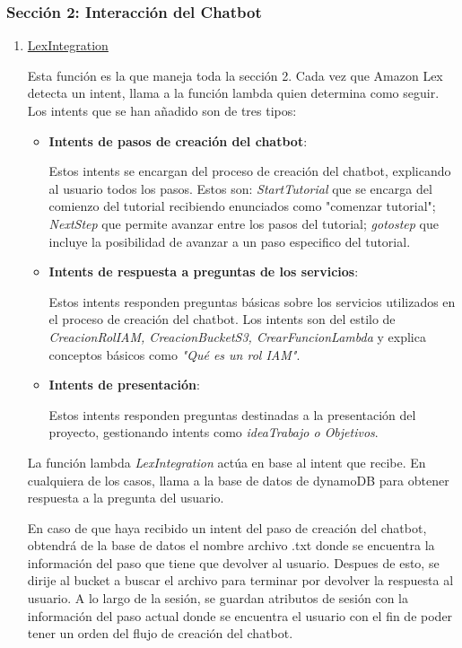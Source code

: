 \subsubsection{Sección 2: Interacción del Chatbot}\label{sec:lexintegration}
\begin{enumerate}[7.]
    \item \underline{LexIntegration} 
    
    Esta función es la que maneja toda la sección 2. Cada vez que Amazon Lex detecta un intent, llama a la función lambda quien determina como seguir. Los intents que se han añadido son de tres tipos:
    \begin{itemize}
    \tightlist
        \item \textbf{Intents de pasos de creación del chatbot}:

        Estos intents se encargan del proceso de creación del chatbot, explicando al usuario todos los pasos. Estos son: \textit{StartTutorial} que se encarga del comienzo del tutorial recibiendo enunciados como "comenzar tutorial"; \textit{NextStep} que permite avanzar entre los pasos del tutorial; \textit{gotostep} que incluye la posibilidad de avanzar a un paso especifico del tutorial.

        \item \textbf{Intents de respuesta a preguntas de los servicios}:

        Estos intents responden preguntas básicas sobre los servicios utilizados en el proceso de creación del chatbot. Los intents son del estilo de \textit{CreacionRolIAM, CreacionBucketS3, CrearFuncionLambda} y explica conceptos básicos como \textit{"Qué es un rol IAM"}.

        \item \textbf{Intents de presentación}:

        Estos intents responden preguntas destinadas a la presentación del proyecto, gestionando intents como \textit{ideaTrabajo o Objetivos}. 
    \end{itemize}

    La función lambda \textit{LexIntegration} actúa en base al intent que recibe. En cualquiera de los casos, llama a la base de datos de dynamoDB para obtener respuesta a la pregunta del usuario. 

    En caso de que haya recibido un intent del paso de creación del chatbot, obtendrá de la base de datos el nombre archivo .txt donde se encuentra la información del paso que tiene que devolver al usuario. Despues de esto, se dirije al bucket a buscar el archivo para terminar por devolver la respuesta al usuario. A lo largo de la sesión, se guardan atributos de sesión con la información del paso actual donde se encuentra el usuario con el fin de poder tener un orden del flujo de creación del chatbot. 
    

\end{enumerate}
